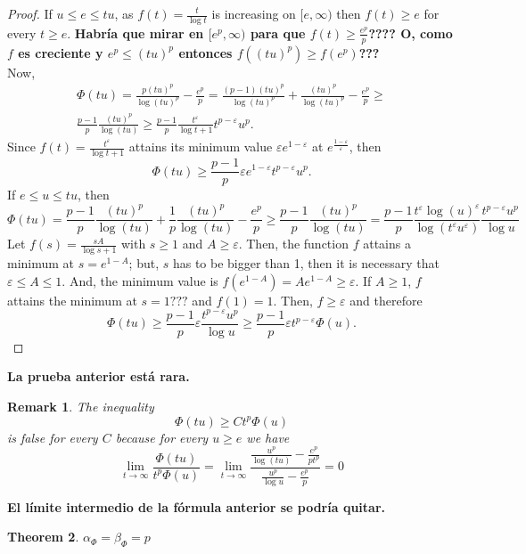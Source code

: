 \documentclass[twoside]{article}
\newtheorem{thm}{Theorem}[section]
\newtheorem{rem}[thm]{Remark}
\theoremstyle{remark}
\renewcommand{\leq}{\leqslant}
\renewcommand{\geq}{\geqslant}
\begin{document}
\begin{proof}
If $u\leq e\leq tu$, as $f(t)=\frac{t}{\log t}$ is increasing on $[e,\infty)$ then $f(t)\geq e$ for every $t\geq e$. 
{\bf Habr\'ia que mirar en $[e^p,\infty)$ para que $f(t)\geq \frac{e^p}{p}$???? O, como $f$ es creciente y 
$e^p\leq (tu)^p$ entonces
$f((tu)^p)\geq f(e^p)$???}
\\
Now, 
\[
\begin{split}
\Phi(tu)=\frac{p(tu)^p}{\log (tu)^p}-\frac{e^p}{p}=
\frac{(p-1)(tu)^p}{\log(tu)^p}+\frac{(tu)^p}{\log (tu)^p}-\frac{e^p}{p}\geq 
\\
\frac{p-1}{p}\frac{(tu)^p}{\log(tu)}\geq
\frac{p-1}{p}\frac{t^{\varepsilon}}{\log t+1}t^{p-\varepsilon}u^p.
\end{split}
\]
Since $f(t)=\frac{t^{\varepsilon}}{\log t+1}$ attains its 
 minimum value $\varepsilon e^{1-\varepsilon}$ at 
$e^{\frac{1-\varepsilon}{\varepsilon}}$, \; then  
\[
\Phi(tu)\geq \frac{p-1}{p}\varepsilon e^{1-\varepsilon}t^{p-\varepsilon}u^p.
\]
If $e\leq u\leq tu$, then 
\[
\Phi(tu)=\frac{p-1}{p}\frac{(tu)^p}{\log(tu)}
+\frac{1}{p}\frac{(tu)^p}{\log(tu)}-\frac{e^p}{p}
\geq
\frac{p-1}{p}\frac{(tu)^p}{\log(tu)}=
\frac{p-1}{p}
\frac{t^{\varepsilon} \log (u)^{\varepsilon}}{\log(t^{\varepsilon}u^{\varepsilon})}
\frac{t^{p-\varepsilon}u^p}{\log u}
\]
Let $f(s)=\frac{sA}{\log s+1}$ with $s\geq 1$ and $A\geq \varepsilon$.
Then, the function $f$ attains a minimum at $s=e^{1-A}$; but, 
$s$ has to be bigger than 1, then it is necessary that
$\varepsilon\leq A\leq 1$.
And, the minimum value is $f(e^{1-A})=Ae^{1-A}\geq \varepsilon$.
If $A\geq 1$, $f$ attains the minimum at $s=1???$ and $f(1)=1$. 
Then, $f\geq \varepsilon$ and  therefore
\[
\Phi(tu)\geq \frac{p-1}{p}\varepsilon \frac{t^{p-\varepsilon}u^p}{\log u}\geq
\frac{p-1}{p}\varepsilon t^{p-\varepsilon}\Phi(u).
\]
\end{proof}

{\bf La prueba anterior est\'a rara.}





\begin{rem}
The inequality 
\[
\Phi(tu)\geq Ct^p\Phi(u)
\] 
is false for every $C$ because for every $u\geq e$ we have 
\[
\lim\limits_{t \to \infty}\frac{\Phi(tu)}{t^p\Phi(u)}=
\lim\limits_{t \to \infty} \frac{\frac{u^p}{\log(tu)}-
\frac{e^p}{pt^p}}{\frac{u^p}{\log u}-\frac{e^p}{p}}=0
\]
\end{rem}


{\bf El l\'imite intermedio de la f\'ormula anterior se podr\'ia quitar.}


\begin{thm}
$\alpha_{\Phi}=\beta_{\Phi}=p$
\end{thm}
\end{document}
